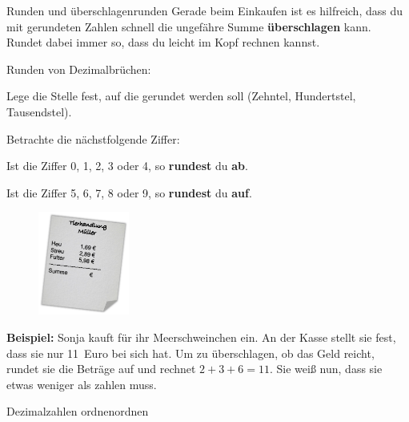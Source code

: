 \documentclass[12pt,a5paper,landscape]{scrartcl}
\begin{document}
	\begin{hilfekarte}{Runden und überschlagen}{runden}
		Gerade beim Einkaufen ist es hilfreich, dass du mit gerundeten Zahlen schnell die ungefähre Summe \textbf{überschlagen} kann. Rundet dabei immer so, dass du leicht im Kopf rechnen kannst.

		Runden von Dezimalbrüchen:
		\begin{smallenumerate}
			\item Lege die Stelle fest, auf die gerundet werden soll (Zehntel, Hundertstel, Tausendstel).
			\item Betrachte die nächstfolgende Ziffer:
			\begin{smallitemize}
				\item Ist die Ziffer 0, 1, 2, 3 oder 4, so \textbf{rundest} du \textbf{ab}.
				\item Ist die Ziffer 5, 6, 7, 8 oder 9, so \textbf{rundest} du \textbf{auf}.
			\end{smallitemize}
		\end{smallenumerate}

		\begin{wrapfig}
			\begin{figure}
				\includegraphics[width=3cm]{6.2-LT-Abb_Kassenzettel_0}
			\end{figure}
			\textbf{Beispiel:} Sonja kauft für ihr Meerschweinchen ein. An der Kasse stellt sie fest, dass sie nur \SI{11}{ Euro} bei sich hat. Um zu überschlagen, ob das Geld reicht, rundet sie die Beträge auf und rechnet $2+3+6=11$. Sie weiß nun, dass sie etwas weniger als  zahlen muss.
		\end{wrapfig}
	\end{hilfekarte}

	\begin{hilfekarte}{Dezimalzahlen ordnen}{ordnen}

	\end{hilfekarte}
\end{document}
